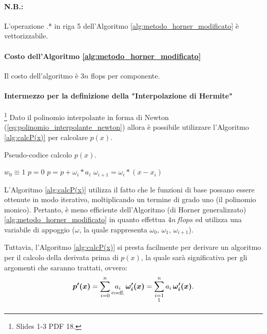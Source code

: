 \paragraph{N.B.:} L'operazione .* in riga 5 dell'Algoritmo \ref{alg:metodo_horner_modificato} è vettorizzabile.

\paragraph{Costo dell'Algoritmo \ref{alg:metodo_horner_modificato}} Il costo dell'algoritmo è $3n$ flops per componente.

\paragraph{Intermezzo per la definizione della "Interpolazione di Hermite"}\footnote{Slides 1-3 PDF 18.} Dato il polinomio interpolante in forma di Newton (\ref{eq:polinomio_interpolante_newton}) allora è possibile utilizzare l'Algoritmo \ref{alg:calcP(x)} per calcolare $p(x)$.

\begin{algorithm}\caption{Pseudo-codice calcolo $p(x)$.}\label{alg:calcP(x)}
    \begin{algorithmic}
        \State $w_0\equiv 1$
        \State $p = 0$
            \State $p = p + \omega_i * a_i$
            \State $\omega_{i+1} = \omega_i *(x - x_i)$
        \EndFor
    \end{algorithmic}
\end{algorithm}

L'Algoritmo \ref{alg:calcP(x)} utilizza il fatto che le funzioni di base possano essere ottenute in modo iterativo, moltiplicando un termine di grado uno (il polinomio monico). Pertanto, è meno efficiente dell'Algoritmo (di Horner generalizzato) \ref{alg:metodo_horner_modificato} in quanto effettua $4n\, flops$ ed utilizza una variabile di appoggio ($\omega$, la quale rappresenta $\omega_0,\,\omega_1,\,\omega_{i+1}$).

Tuttavia, l'Algoritmo \ref{alg:calcP(x)} si presta facilmente per derivare un algoritmo per il calcolo della derivata prima di $p(x)$, la quale sarà significativa per gli argomenti che saranno trattati, ovvero:
\begin{equation*}
    \boldsymbol{p'(x)}=\sum_{i=0}^n\underset{\text{coeff.}}{a_i}\,\boldsymbol{\omega'_i(x)}=\sum_{\underset{\footnotemark}{i=1}}^na_i\,\boldsymbol{\omega'_i(x)}.
\end{equation*}

